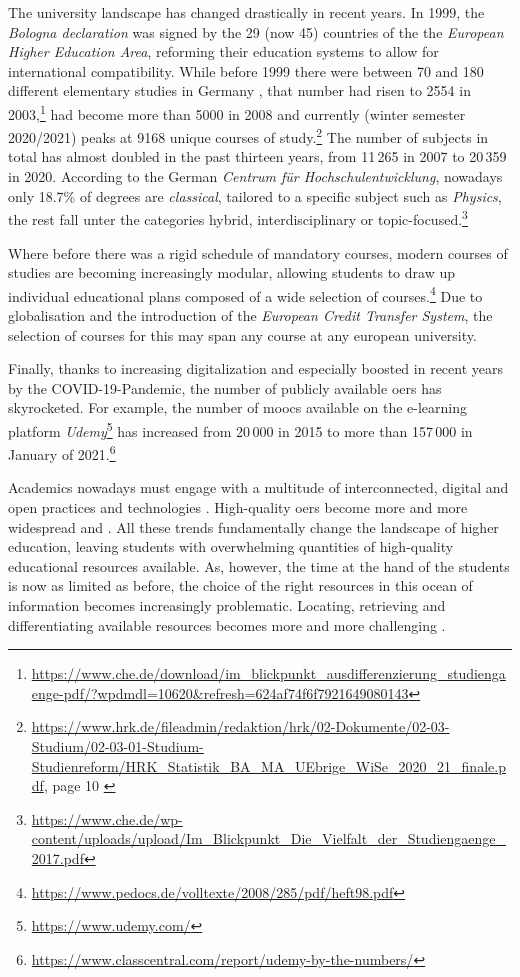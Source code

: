 The university landscape has changed drastically in recent years. In 1999, the \textit{Bologna declaration} was signed by the 29 (now 45) countries of the the \textit{European Higher Education Area}, reforming their education systems to allow for international compatibility. While before 1999 there were between 70 and 180 different elementary studies in Germany \cite{Schroder2015}, that number had risen to 2554 in 2003,\footnote{\url{https://www.che.de/download/im_blickpunkt_ausdifferenzierung_studiengaenge-pdf/?wpdmdl=10620&refresh=624af74f6f7921649080143}} had become more than 5000 in 2008 and currently (winter semester 2020/2021) peaks at 9168 unique courses of study.\footnote{\url{https://www.hrk.de/fileadmin/redaktion/hrk/02-Dokumente/02-03-Studium/02-03-01-Studium-Studienreform/HRK_Statistik_BA_MA_UEbrige_WiSe_2020_21_finale.pdf}, page 10 \label{fnote:degreenums}} The number of subjects in total has almost doubled in the past thirteen years, from 11\,265 in 2007 to 20\,359 in 2020. According to the German \textit{Centrum für Hochschulentwicklung}, nowadays only 18.7\% of degrees are \textit{classical}, \ie tailored to a specific subject such as \textit{Physics}, the rest fall unter the categories hybrid, interdisciplinary or topic-focused.\footnote{\url{https://www.che.de/wp-content/uploads/upload/Im_Blickpunkt_Die_Vielfalt_der_Studiengaenge_2017.pdf}}

Where before there was a rigid schedule of mandatory courses, modern courses of studies are becoming increasingly modular, allowing students to draw up individual educational plans composed of a wide selection of courses.\footnote{\url{https://www.pedocs.de/volltexte/2008/285/pdf/heft98.pdf}} Due to globalisation and the introduction of the \emph{European Credit Transfer System}, the selection of courses for this may span any course at any european university.

Finally, thanks to increasing digitalization and especially boosted in recent years by the COVID-19-Pandemic, the number of publicly available \glspl{oer} has skyrocketed. For example, the number of \glspl{mooc} available on the e-learning platform \textit{Udemy}\footnote{\url{https://www.udemy.com/}} has increased from 20\,000 in 2015 to more than 157\,000 in January of 2021.\footnote{\url{https://www.classcentral.com/report/udemy-by-the-numbers/}}

Academics nowadays must engage with a multitude of interconnected, digital and open practices and technologies \cite{Atenas2014}. High-quality \glspl{oer} become more and more widespread and  \cite[2]{Olcott2012}. All these trends fundamentally change the landscape of higher education, leaving students with overwhelming quantities of high-quality educational resources available. As, however, the time at the hand of the students is now as limited as before, the choice of the right resources in this ocean of information becomes increasingly problematic. Locating, retrieving and differentiating available resources becomes more and more challenging \cite{Atenas2014}.

